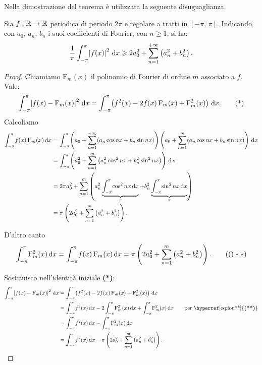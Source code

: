 \documentclass[../../analisi2]{subfiles}
\begin{document}
        Nella dimostrazione del teorema è utilizzata la seguente disuguaglianza.

        \begin{teorema}
            Sia \(f : \mathbb{R} \to \mathbb{R}\) periodica di periodo \(2\pi\) e regolare a tratti in \([-\pi, \, \pi]\). Indicando con
            \(a_0, \, a_n, \, b_n\) i suoi coefficienti di Fourier, con \(n \geqslant 1\), si ha:
            \[
                \frac{1}{\pi} \int_{-\pi}^{\pi} \! \left|f(x)\right|^2 \, \mathrm{d}x \geqslant 2 a_0^2 + \sum_{n = 1}^{+\infty} \left(a_n^2 + b_n^2\right).
            \]
        \end{teorema}
        \begin{proof}
            Chiamiamo \(\mathrm{F}_m (x)\) il polinomio di Fourier di ordine \(m\) associato a \(f\). Vale:
            \[
                \int_{-\pi}^{\pi} \! \left|f(x) - \mathrm{F}_m (x)\right|^2 \, \mathrm{d}x = \int_{-\pi}^{\pi} \! \left(f^2(x) - 2 f(x) \, \mathrm{F}_m (x) + \mathrm{F}_m^2 (x)\right) \, \mathrm{d}x.\tag{*}\label{eq:fou*}
            \]
            Calcoliamo
            \begin{align*}
                \int_{-\pi}^{\pi} \! f(x) \, \mathrm{F}_m (x) \, \mathrm{d}x &= \int_{-\pi}^{\pi} \! \left(a_0 + \sum_{n = 1}^{+\infty} (a_n \cos nx + b_n \sin nx)\right)
                    \left(a_0 + \sum_{n = 1}^{m} (a_n \cos nx + b_n \sin nx)\right) \, \mathrm{d}x\\
                &= \int_{-\pi}^{\pi} \! \left(a_0^2 + \sum_{n = 1}^m \left(a_n^2 \cos^2 nx + b_n^2 \sin^2 nx\right)\right) \, \mathrm{d}x\\
                &= 2\pi a_0^2 + \sum_{n = 1}^m \left(a_n^2 \underbrace{\int_{-\pi}^{\pi} \! \cos^2 nx \, \mathrm{d}x}_{\pi} + b_n^2 \underbrace{\int_{-\pi}^{\pi} \! \sin^2 nx \, \mathrm{d}x}_{\pi}\right)\\
                &= \pi \left(2 a_0^2 + \sum_{n = 1}^m \left(a_n^2 + b_n^2\right)\right).
            \end{align*}

            D'altro canto
            \[
                \intDef{-\pi}{\pi}{\mathrm{F}_m^2 (x)}{x} = \intDef{-\pi}{\pi}{f(x) \, \mathrm{F}_m (x)}{x} = \pi \left(2 a_0^2 + \sum_{n = 1}^m \left(a_n^2 + b_n^2\right)\right).\tag(**)\label{eq:fou**}
            \]

            Sostituisco nell'identità iniziale \hyperref[eq:fou*]{\textbf{(*)}}:
            \begin{align*}
                \intDef{-\pi}{\pi}{\left|f(x) - \mathrm{F}_m (x)\right|^2}{x} &= \intDef{-\pi}{\pi}{\left(f^2(x) - 2 f(x) \, \mathrm{F}_m (x) + \mathrm{F}_m^2 (x)\right)}{x}\\
                &= \intDef{-\pi}{\pi}{f^2 (x)}{x} - 2\intDef{-\pi}{\pi}{\mathrm{F}_m^2 (x)}{x} + \intDef{-\pi}{\pi}{\mathrm{F}_m^2 (x)}{x} \qquad \text{per \hyperref[eq:fou**]{\textbf{(**)}}}\\
                &= \intDef{-\pi}{\pi}{f^2 (x)}{x} - \intDef{-\pi}{\pi}{\mathrm{F}_m^2 (x)}{x}\\
                &= \intDef{-\pi}{\pi}{f^2(x)}{x} - \pi \left(2 a_0^2 + \sum_{n = 1}^m \left(a_n^2 + b_n^2\right)\right).
            \end{align*}


\end{proof}
\end{document}

